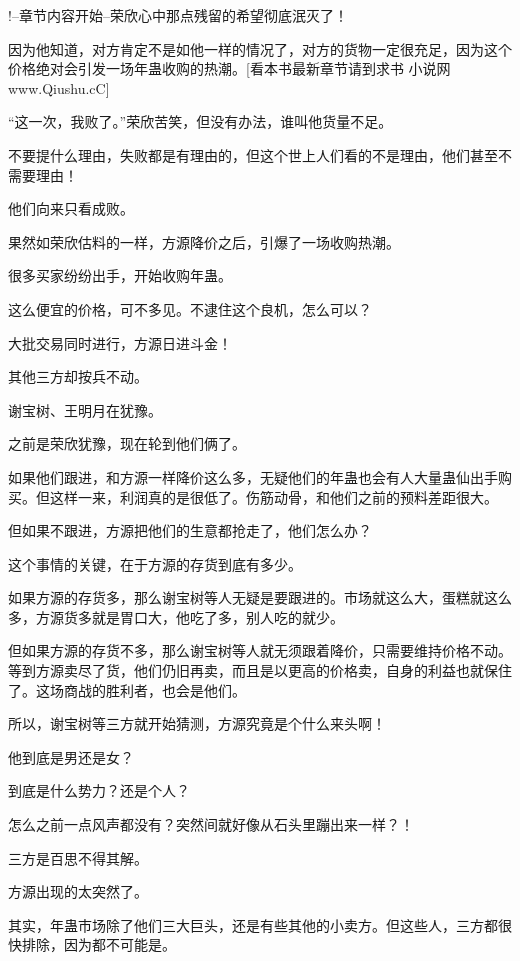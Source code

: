 
\begin{this_body}

!--章节内容开始--荣欣心中那点残留的希望彻底泯灭了！

因为他知道，对方肯定不是如他一样的情况了，对方的货物一定很充足，因为这个价格绝对会引发一场年蛊收购的热潮。[看本书最新章节请到求书 小说网www.Qiushu.cC]

“这一次，我败了。”荣欣苦笑，但没有办法，谁叫他货量不足。

不要提什么理由，失败都是有理由的，但这个世上人们看的不是理由，他们甚至不需要理由！

他们向来只看成败。

果然如荣欣估料的一样，方源降价之后，引爆了一场收购热潮。

很多买家纷纷出手，开始收购年蛊。

这么便宜的价格，可不多见。不逮住这个良机，怎么可以？

大批交易同时进行，方源日进斗金！

其他三方却按兵不动。

谢宝树、王明月在犹豫。

之前是荣欣犹豫，现在轮到他们俩了。

如果他们跟进，和方源一样降价这么多，无疑他们的年蛊也会有人大量蛊仙出手购买。但这样一来，利润真的是很低了。伤筋动骨，和他们之前的预料差距很大。

但如果不跟进，方源把他们的生意都抢走了，他们怎么办？

这个事情的关键，在于方源的存货到底有多少。

如果方源的存货多，那么谢宝树等人无疑是要跟进的。市场就这么大，蛋糕就这么多，方源货多就是胃口大，他吃了多，别人吃的就少。

但如果方源的存货不多，那么谢宝树等人就无须跟着降价，只需要维持价格不动。等到方源卖尽了货，他们仍旧再卖，而且是以更高的价格卖，自身的利益也就保住了。这场商战的胜利者，也会是他们。

所以，谢宝树等三方就开始猜测，方源究竟是个什么来头啊！

他到底是男还是女？

到底是什么势力？还是个人？

怎么之前一点风声都没有？突然间就好像从石头里蹦出来一样？！

三方是百思不得其解。

方源出现的太突然了。

其实，年蛊市场除了他们三大巨头，还是有些其他的小卖方。但这些人，三方都很快排除，因为都不可能是。


\end{this_body}
